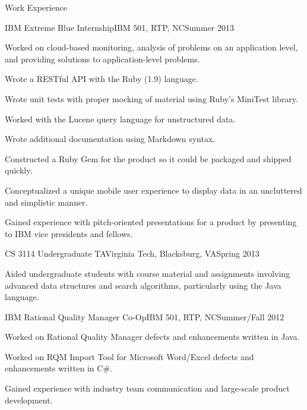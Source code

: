 \documentclass[10pt,a4paper]{article}
\begin{document}
\addvspace{1em}
    {Work Experience} {
     \begin{resumeinfo}{IBM Extreme Blue Internship}{IBM 501, RTP, NC}{Summer 2013}
         \item Worked on cloud-based monitoring, analysis of problems on an application level,
               and providing solutions to application-level problems.
         \item Wrote a RESTful API with the Ruby (1.9) language.
         \item Wrote unit tests with proper mocking of material using Ruby's MiniTest library.
         \item Worked with the Lucene query language for unstructured data.
         \item Wrote additional documentation using Markdown syntax.
         \item Constructed a Ruby Gem for the product so it could be packaged and shipped quickly.
         \item Conceptualized a unique mobile user experience to display data in an
               uncluttered and simplistic manner.
         \item Gained experience with pitch-oriented presentations for a product by presenting
               to IBM vice presidents and fellows.
     \end{resumeinfo}
     \addvspace{1em}
     \begin{resumeinfo}{CS 3114 Undergraduate TA}{Virginia Tech, Blacksburg, VA}{Spring 2013}
         \item Aided undergraduate students with course material and assignments
               involving advanced data structures and search algorithms, particularly using
               the Java language.
     \end{resumeinfo}
     \addvspace{1em}
     \begin{resumeinfo}{IBM Rational Quality Manager Co-Op}{IBM 501, RTP, NC}{Summer/Fall 2012}
         \item Worked on Rational Quality Manager defects and enhancements written in Java.
         \item Worked on RQM Import Tool for Microsoft Word/Excel defects and enhancements
               written in C\#.
         \item Gained experience with industry team communication and large-scale product development.

\end{resumeinfo}}
\end{document}
